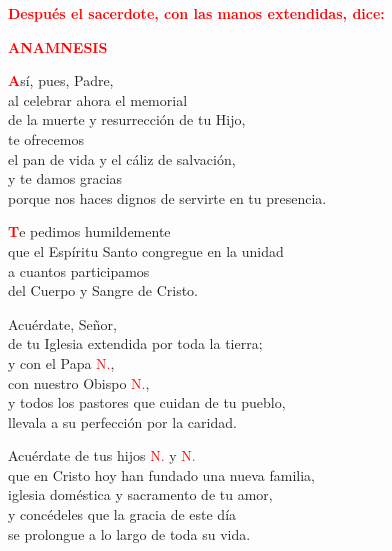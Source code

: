 \documentclass[12pt, letterpaper, spanish]{report}
\begin{document}
\large{\bfseries \textcolor{red}{Despu\'es el sacerdote, con las manos extendidas, dice:}}\newline

\Large {\bfseries \textcolor{red}{ANAMNESIS}} \newline

\Large \lettrine{\bfseries \textcolor{red}{A}}{}s\'i, pues, Padre,\\
al celebrar ahora el memorial\\
de la muerte y resurrecci\'on de tu Hijo,\\
te ofrecemos\\
el pan de vida y el c\'aliz de salvaci\'on,\\
y te damos gracias\\
porque nos haces dignos de servirte en tu presencia.\newline

\lettrine{\bfseries \textcolor{red}{T}}{}e pedimos humildemente\\
que el Esp\'iritu Santo congregue en la unidad\\
a cuantos participamos\\
del Cuerpo y Sangre de Cristo.\newline

Acu\'erdate, Se\~nor,\\
de tu Iglesia extendida por toda la tierra; \\
y con el Papa \textcolor{red}{N.},\\
con nuestro Obispo \textcolor{red}{N.},\\
y todos los pastores que cuidan de tu pueblo,\\
llevala a su perfecci\'on por la caridad.\newline

Acu\'erdate de tus hijos \textcolor{red}{N.} y \textcolor{red}{N.} \\
que en Cristo hoy han fundado una nueva familia, \\
iglesia dom\'estica y sacramento de tu amor, \\
y conc\'edeles que la gracia de este d\'ia \\
se prolongue a lo largo de toda su vida.\newline
\end{document}
